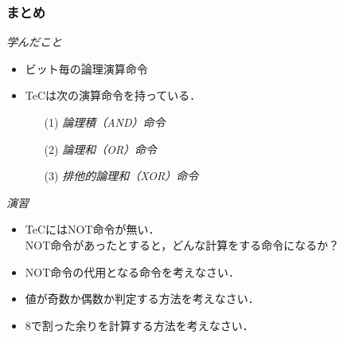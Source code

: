\documentclass{beamer}                 %
\begin{document}
\begin{frame}
  \frametitle{まとめ}
  \emph{学んだこと}
  \begin{itemize}
  \item ビット毎の論理演算命令
  \item TeCは次の演算命令を持っている．
    \begin{enumerate}
    \item[(1)] \emph{論理積（AND）命令}
    \item[(2)] \emph{論理和（OR）命令}
    \item[(3)] \emph{排他的論理和（XOR）命令}
    \end{enumerate}
  \end{itemize}
  \vfill
  \emph{演習}
  \begin{itemize}
  \item TeCにはNOT命令が無い．\\
    NOT命令があったとすると，どんな計算をする命令になるか？
  \item NOT命令の代用となる命令を考えなさい．
  \item 値が奇数か偶数か判定する方法を考えなさい．
  \item 8で割った余りを計算する方法を考えなさい．
  \end{itemize}
  \vfill
\end{frame}
\end{document}
